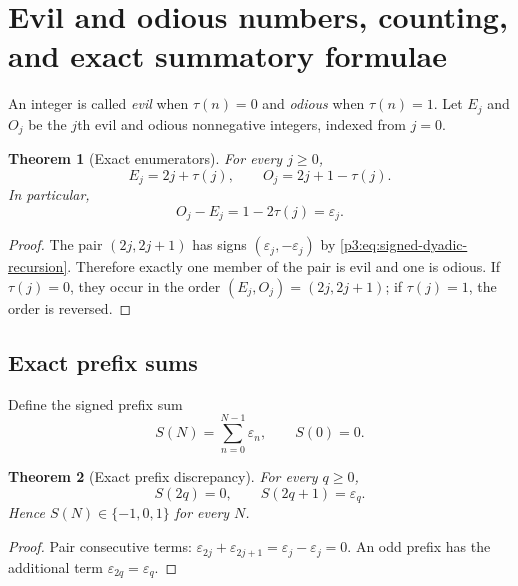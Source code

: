 \documentclass[11pt,oneside]{article}
\newtheorem{theorem}{Theorem}[section]
\theoremstyle{definition}
\theoremstyle{remark}
\newcommand{\eps}{\varepsilon}
\begin{document}
\section{Evil and odious numbers, counting, and exact summatory formulae}

An integer is called \emph{evil} when $\tau(n)=0$ and \emph{odious} when
$\tau(n)=1$.  Let $E_j$ and $O_j$ be the $j$th evil and odious nonnegative
integers, indexed from $j=0$.

\begin{theorem}[Exact enumerators]\label{p3:thm:evil-odious-enumerators}
For every $j\ge0$,
\begin{equation}\label{p3:eq:evil-odious-enumerators}
 \boxed{\quad E_j=2j+\tau(j),\qquad
 O_j=2j+1-\tau(j).\quad}
\end{equation}
In particular,
\begin{equation}\label{p3:eq:evil-odious-gap}
 O_j-E_j=1-2\tau(j)=\eps_j.
\end{equation}
\end{theorem}

\begin{proof}
The pair $(2j,2j+1)$ has signs $(\eps_j,-\eps_j)$ by
\cref{p3:eq:signed-dyadic-recursion}.  Therefore exactly one member of the pair is
evil and one is odious.  If $\tau(j)=0$, they occur in the order
$(E_j,O_j)=(2j,2j+1)$; if $\tau(j)=1$, the order is reversed.
\end{proof}

\subsection{Exact prefix sums}

Define the signed prefix sum
\begin{equation}\label{p3:eq:prefix-sum-def}
 S(N)=\sum_{n=0}^{N-1}\eps_n,
 \qquad S(0)=0.
\end{equation}

\begin{theorem}[Exact prefix discrepancy]\label{p3:thm:prefix-discrepancy}
For every $q\ge0$,
\begin{equation}\label{p3:eq:prefix-discrepancy}
 S(2q)=0,
 \qquad
 S(2q+1)=\eps_q.
\end{equation}
Hence $S(N)\in\{-1,0,1\}$ for every $N$.
\end{theorem}

\begin{proof}
Pair consecutive terms:
$\eps_{2j}+\eps_{2j+1}=\eps_j-\eps_j=0$.  An odd prefix has the additional
term $\eps_{2q}=\eps_q$.
\end{proof}
\end{document}
